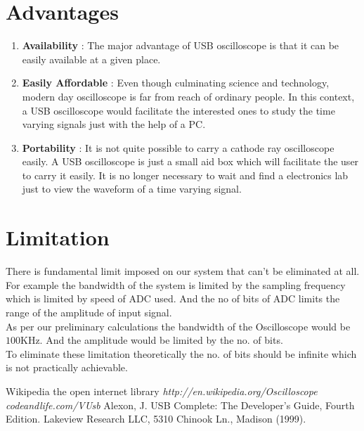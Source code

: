 \documentclass[12pt,a4paper]{article}
\begin{document}
\section{Advantages}
\begin{enumerate}
\item \textbf{Availability} : The major advantage of USB oscilloscope is that it can be easily available at a given place.
\item\textbf{Easily Affordable} : Even though culminating science and technology, modern day oscilloscope is far from reach of ordinary people. In this context, a USB oscilloscope would facilitate the interested ones to study the time varying signals just with the help of a PC.
\item\textbf{Portability} : It is not quite possible to carry a cathode ray oscilloscope easily. A USB oscilloscope is just a small aid box which will facilitate the user to carry it easily. It is no longer necessary to wait and find a electronics lab just to view the waveform of a time varying signal.

\end{enumerate}

\section{Limitation}
There is fundamental limit imposed on our system that can't be eliminated at all. For example the bandwidth of the system is limited by the sampling frequency which is limited by speed of ADC used. And the no of bits of ADC limits the range of the amplitude of input signal.\\

As per our preliminary calculations the bandwidth of the Oscilloscope would be $100$KHz.  And the amplitude would be limited by the no. of bits.\\

To eliminate these limitation theoretically the no. of bits should be infinite which is not practically achievable.


\begin{thebibliography}{99}
\bibitem{} Wikipedia the open internet library \emph{http://en.wikipedia.org/Oscilloscope}
\bibitem{} \emph{codeandlife.com/VUsb}
\bibitem{} Alexon, J. USB Complete: The Developer’s Guide, Fourth Edition. Lakeview Research LLC, 5310 Chinook Ln., Madison  (1999).

\end{thebibliography}
\end{document}
